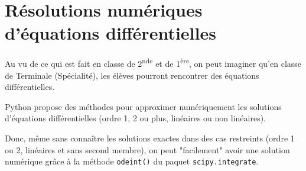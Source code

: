 \documentclass[11pt]{article}
\begin{document}

\newpage

\setcounter{section}{8}


\section{Résolutions numériques d'équations différentielles}




Au vu de ce qui est fait en classe de 2\textsuperscript{nde} et de 1\textsuperscript{ère}, on peut imaginer qu'en classe de Terminale (Spécialité), les élèves pourront rencontrer des équations différentielles. 

\smallskip
Python propose des méthodes pour approximer numériquement les solutions d'équations différentielles (ordre 1, 2 ou plus, linéaires ou non linéaires).

\smallskip
Donc, même sans connaître les solutions exactes dans des cas restreints (ordre 1 ou 2, linéaires et sans second membre), on peut "facilement" avoir une solution numérique grâce à la méthode \texttt{odeint()} du paquet \texttt{scipy.integrate}.
\end{document}

